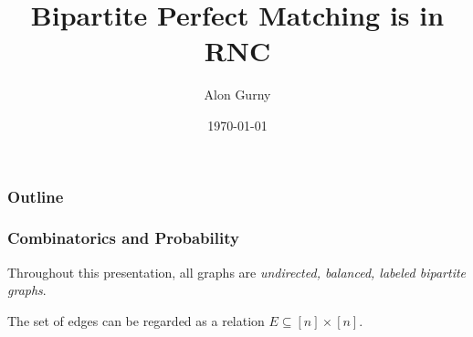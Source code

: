 \documentclass{beamer}
\title{Bipartite Perfect Matching is in RNC}
\author{Alon Gurny}
\date{\today}
\begin{document}
\frame{\titlepage}





\begin{frame}
  \frametitle{Outline}
  \tableofcontents
\end{frame}




\begin{frame}
  \frametitle{Combinatorics and Probability}

  Throughout this presentation, all graphs are
  \emph{undirected, balanced, labeled bipartite graphs}.

  The set of edges can be regarded as a relation $E \subseteq [n] \times [n]$.
\end{frame}
\end{document}
